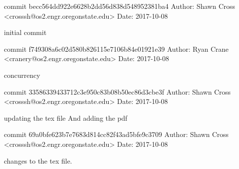 commit becc564dd922e6628b2dd56d838d548952381ba4
Author: Shawn Cross <crosssh@os2.engr.oregonstate.edu>
Date:   2017-10-08

    initial commit

commit f749308a6c02d580b826115e7106b84e01921e39
Author: Ryan Crane <cranery@os2.engr.oregonstate.edu>
Date:   2017-10-08

    concurrency

commit 33586339433712c3e950c83b08b50ec86d3cbe3f
Author: Shawn Cross <crosssh@os2.engr.oregonstate.edu>
Date:   2017-10-08

    updating the tex file And adding the pdf

commit 69a0bfe623b7e7683d814cc82f43ad5bfe9c3709
Author: Shawn Cross <crosssh@os2.engr.oregonstate.edu>
Date:   2017-10-08

    changes to the tex file.
